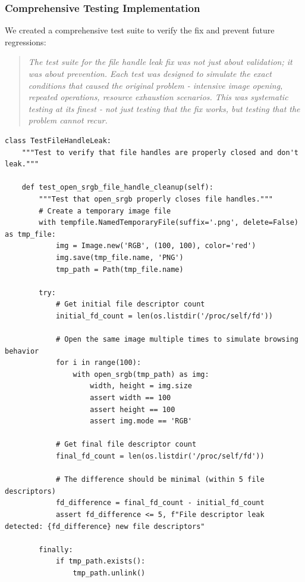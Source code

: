 \documentclass[11pt]{article}
\begin{document}
\subsubsection{Comprehensive Testing Implementation}

We created a comprehensive test suite to verify the fix and prevent future regressions:

\begin{quote}
\emph{The test suite for the file handle leak fix was not just about validation; it was about prevention. Each test was designed to simulate the exact conditions that caused the original problem - intensive image opening, repeated operations, resource exhaustion scenarios. This was systematic testing at its finest - not just testing that the fix works, but testing that the problem cannot recur.}
\end{quote}

\begin{lstlisting}[style=python]
class TestFileHandleLeak:
    """Test to verify that file handles are properly closed and don't leak."""

    def test_open_srgb_file_handle_cleanup(self):
        """Test that open_srgb properly closes file handles."""
        # Create a temporary image file
        with tempfile.NamedTemporaryFile(suffix='.png', delete=False) as tmp_file:
            img = Image.new('RGB', (100, 100), color='red')
            img.save(tmp_file.name, 'PNG')
            tmp_path = Path(tmp_file.name)

        try:
            # Get initial file descriptor count
            initial_fd_count = len(os.listdir('/proc/self/fd'))
            
            # Open the same image multiple times to simulate browsing behavior
            for i in range(100):
                with open_srgb(tmp_path) as img:
                    width, height = img.size
                    assert width == 100
                    assert height == 100
                    assert img.mode == 'RGB'
            
            # Get final file descriptor count
            final_fd_count = len(os.listdir('/proc/self/fd'))
            
            # The difference should be minimal (within 5 file descriptors)
            fd_difference = final_fd_count - initial_fd_count
            assert fd_difference <= 5, f"File descriptor leak detected: {fd_difference} new file descriptors"
            
        finally:
            if tmp_path.exists():
                tmp_path.unlink()
\end{lstlisting}
\end{document}
